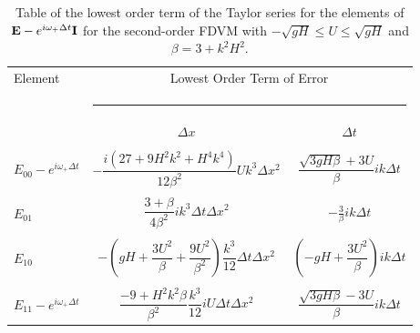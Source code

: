 \begin{table}
	\begin{tabular}{l  c c}
		Element & \multicolumn{2}{c}{Lowest Order Term of Error}\\
		&  \multicolumn{2}{l}{\rule{0.7\textwidth}{0.4pt}} \\
		& $\Delta x$&$\Delta t$\\
		\hline && \\
		$E_{00} -  e^{i \omega_+ \Delta t} $& $ -\dfrac{i \left(27 + 9H^2k^2 + H^4k^4\right)}{12\beta^2} U k^3 \Delta x^2$ & $\dfrac{\sqrt{3gH \beta} + 3U}{\beta} ik \Delta t$ \\ & & \\
		$E_{01}$& $ \dfrac{3 + \beta}{4 \beta^2}i k^3\Delta  t\Delta x^2$ &  $ - \frac{3}{\beta} ik\Delta t$ \\ & & \\
		$E_{10}$& $ -\left(gH + \dfrac{3U^2}{\beta} + \dfrac{9U^2}{\beta^2}\right)  \dfrac{k^3}{12}\Delta t\Delta x^2$ &  $ \left(-gH + \dfrac{3U^2}{\beta}\right)ik \Delta t$ \\ & & \\
		$E_{11} -  e^{i \omega_+ \Delta t}$& $ \dfrac{-9 + H^2k^2\beta}{\beta^2} \dfrac{k^3}{12} i U \Delta t\Delta x^2$ & $\dfrac{\sqrt{3gH \beta} - 3U}{\beta} ik \Delta t$ \\ 
	\end{tabular}
	\caption{Table of the lowest order term of the Taylor series for the elements of $\mathbf{E} - e^{i \omega_+ \Delta t} \mathbf{I}$ for the second-order FDVM with $ -\sqrt{gH} \le U \le \sqrt{gH}$ and $\beta = 3 + k^2 H^2$.}
	\label{tab:EerrFDVM2} 
\end{table}



